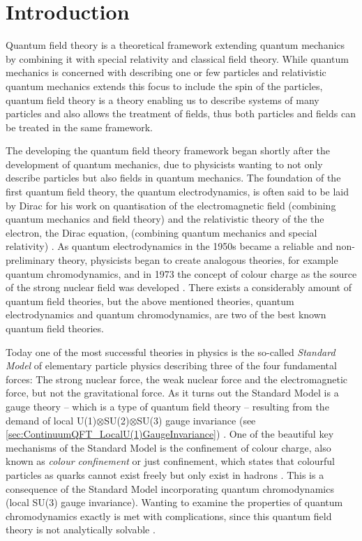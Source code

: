 \documentclass[../main.tex]{subfiles} %
\begin{document}
\chapter{Introduction} \label{chap:Introduction}

Quantum field theory is a theoretical framework extending quantum mechanics by combining it with special relativity and classical field theory. While quantum mechanics is concerned with describing one or few particles and relativistic quantum mechanics extends this focus to include the spin of the particles, quantum field theory is a theory enabling us to describe systems of many particles and also allows the treatment of fields, thus both particles and fields can be treated in the same framework. \cite{stanford_QFT}

The developing the quantum field theory framework began shortly after the development of quantum mechanics, due to physicists wanting to not only describe particles but also fields in quantum mechanics. The foundation of the first quantum field theory, the quantum electrodynamics, is often said to be laid by Dirac for his work on quantisation of the electromagnetic field (combining quantum mechanics and field theory) and the relativistic theory of the the electron, the Dirac equation, (combining quantum mechanics and special relativity) \cite{stanford_historyOfQFT}. As quantum electrodynamics in the 1950s became a reliable and non-preliminary theory, physicists began to create analogous theories, for example quantum chromodynamics, and in 1973 the concept of colour charge as the source of the strong nuclear field was developed \cite{britannica_QCD}. There exists a considerably amount of quantum field theories, but the above mentioned theories, quantum electrodynamics and quantum chromodynamics, are two of the best known quantum field theories.

Today one of the most successful theories in physics is the so-called \emph{Standard Model} of elementary particle physics \cite{peskin_introToQFT_1995} describing three of the four fundamental forces: The strong nuclear force, the weak nuclear force and the electromagnetic force, but not the gravitational force. As it turns out the Standard Model is a gauge theory -- which is a type of quantum field theory -- resulting from the demand of local U(1)$\otimes$SU(2)$\otimes$SU(3) gauge invariance (see \cref{sec:ContinuumQFT_LocalU(1)GaugeInvariance}) \cite{peskin_introToQFT_1995, stanford_historyOfQFT}.
One of the beautiful key mechanisms of the Standard Model is the confinement of colour charge, also known as \emph{colour confinement} or just confinement, which states that colourful particles as quarks cannot exist freely but only exist in hadrons \cite{peskin_introToQFT_1995, wilson_confinement_1974, griffiths_introToElementaryParticles_2008}. This is a consequence of the Standard Model incorporating quantum chromodynamics (local SU(3) gauge invariance). Wanting to examine the properties of quantum chromodynamics exactly is met with complications, since this quantum field theory is not analytically solvable \cite{fox_parallelComputingWorks_1994}.
\end{document}
